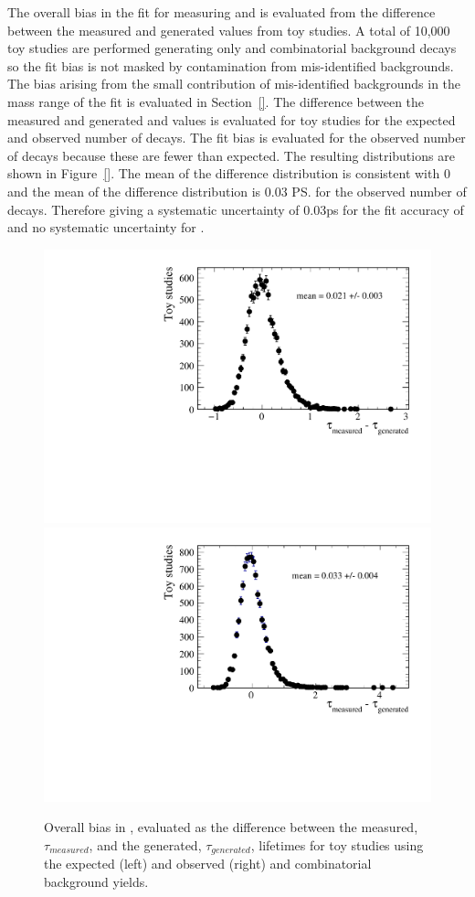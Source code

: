 The overall bias in the fit for measuring \tmumu and \Gmumu is evaluated from the difference between the measured and generated values from toy studies. A total of 10,000 toy studies are performed generating only \bsmumu and combinatorial background decays so the fit bias is not masked by contamination from mis-identified backgrounds.  The bias arising from the small contribution of mis-identified backgrounds in the mass range of the fit is evaluated in Section~\ref{}. The difference between the measured and generated \tmumu and \Gmumu values is evaluated for toy studies for the expected and observed number of \bsmumu decays. The fit bias is evaluated for the observed number of decays because these are fewer than expected. The resulting distributions are shown in Figure~\ref{}. The mean of the \Gmumu difference distribution is consistent with 0 and the mean of the \tmumu difference distribution is 0.03 \ps for the observed number of decays.  Therefore giving a systematic uncertainty of 0.03ps for the fit accuracy of \tmumu and no systematic uncertainty for \Gmumu.

\begin{figure}[htbp]
    \centering
        \includegraphics[width=0.49 \textwidth]{./Figs/LifetimeSystematics/tau_meas-tau_gen_expected.pdf}
        \includegraphics[width=0.49 \textwidth]{./Figs/LifetimeSystematics/tau_meas_tau_gen_observed.pdf}
    \caption{Overall bias in \tmumu, evaluated as the difference between the measured, $\tau_{measured}$, and the generated, $\tau_{generated}$, lifetimes for toy studies using the expected (left) and observed (right) \bsmumu and combinatorial background yields.}
    \label{fig:BsmumuYieldPulls}
\end{figure}


